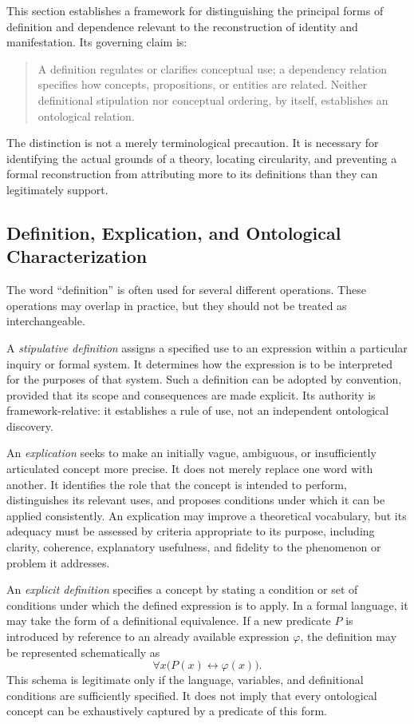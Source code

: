 This section establishes a framework for distinguishing the principal
forms of definition and dependence relevant to the reconstruction of
identity and manifestation. Its governing claim is:

\begin{quote}
A definition regulates or clarifies conceptual use; a dependency
relation specifies how concepts, propositions, or entities are related.
Neither definitional stipulation nor conceptual ordering, by itself,
establishes an ontological relation.
\end{quote}

The distinction is not a merely terminological precaution. It is
necessary for identifying the actual grounds of a theory, locating
circularity, and preventing a formal reconstruction from attributing
more to its definitions than they can legitimately support.

\subsection{Definition, Explication, and Ontological Characterization}

The word ``definition'' is often used for several different operations.
These operations may overlap in practice, but they should not be
treated as interchangeable.

A \emph{stipulative definition} assigns a specified use to an
expression within a particular inquiry or formal system. It determines
how the expression is to be interpreted for the purposes of that
system. Such a definition can be adopted by convention, provided that
its scope and consequences are made explicit. Its authority is
framework-relative: it establishes a rule of use, not an independent
ontological discovery.

An \emph{explication} seeks to make an initially vague, ambiguous, or
insufficiently articulated concept more precise. It does not merely
replace one word with another. It identifies the role that the concept
is intended to perform, distinguishes its relevant uses, and proposes
conditions under which it can be applied consistently. An explication
may improve a theoretical vocabulary, but its adequacy must be assessed
by criteria appropriate to its purpose, including clarity, coherence,
explanatory usefulness, and fidelity to the phenomenon or problem it
addresses.

An \emph{explicit definition} specifies a concept by stating a
condition or set of conditions under which the defined expression is
to apply. In a formal language, it may take the form of a definitional
equivalence. If a new predicate \(P\) is introduced by reference to an
already available expression \(\varphi\), the definition may be
represented schematically as
\[
  \forall x\bigl(P(x) \leftrightarrow \varphi(x)\bigr).
\]
This schema is legitimate only if the language, variables, and
definitional conditions are sufficiently specified. It does not imply
that every ontological concept can be exhaustively captured by a
predicate of this form.

